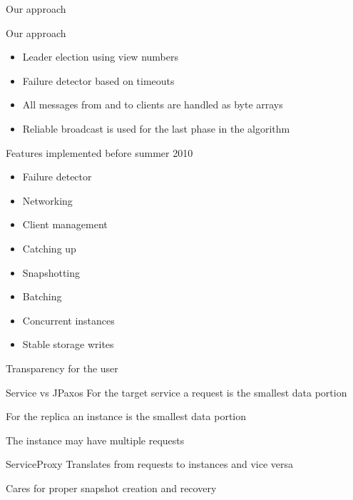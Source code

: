 \documentclass[hyperref={pdfpagelabels=true},11pt,compress,trans]{beamer}
\begin{document}
\begin{frame}{Our approach}
  \begin{block}{Our approach}
    \vspace{-1em}\vspace{-\parskip}\vspace{-\lineskip}
    \begin{itemize}
      \item Leader election using view numbers
      \item Failure detector based on timeouts
      \item All messages from and to clients are handled as byte arrays
      \item Reliable broadcast is used for the last phase in the algorithm
    \end{itemize}
  \end{block}
\end{frame}

\begin{frame}{Features implemented before summer 2010}
 \begin{block}{}
    \vspace{-1em}\vspace{-\parskip}\vspace{-\lineskip}
    \begin{itemize}
      \item Failure detector
      \item Networking
      \item Client management
      \item Catching up
      \item Snapshotting
      \item Batching
      \item Concurrent instances
      \item Stable storage writes
    \end{itemize}
  \end{block}
\end{frame}

\begin{frame}{Transparency for the user}
 \begin{block}{Service vs JPaxos}
  For the target service a request is the smallest data portion
  
  For the replica an instance is the smallest data portion
  
  The instance may have multiple requests
 \end{block}

 \begin{block}{ServiceProxy}
  Translates from requests to instances and vice versa
  
  Cares for proper snapshot creation and recovery
 \end{block}
\end{frame}
\end{document}
